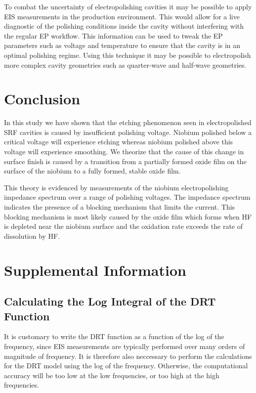 \documentclass[11pt]{article}
\begin{document}
To combat the uncertainty of electropolishing cavities it may be possible to apply EIS measurements in the production environment. This would allow for a live diagnostic of the polishing conditions inside the cavity without interfering with the regular EP workflow. This information can be used to tweak the EP parameters such as voltage and temperature to ensure that the cavity is in an optimal polishing regime. Using this technique it may be possible to electropolish more complex cavity geometries such as quarter-wave and half-wave geometries.



\section{Conclusion}
\label{sec:org57282ed}
In this study we have shown that the etching phenomenon seen in electropolished SRF cavities is caused by insufficient polishing voltage. Niobium polished below a critical voltage will experience etching whereas niobium polished above this voltage will experience smoothing. We theorize that the cause of this change in surface finish is caused by a transition from a partially formed oxide film on the surface of the niobium to a fully formed, stable oxide film.

This theory is evidenced by measurements of the niobium electropolishing impedance spectrum over a range of polishing voltages. The impedance spectrum indicates the presence of a blocking mechanism that limits the current. This blocking mechanism is most likely caused by the oxide film which forms when HF is depleted near the niobium surface and the oxidation rate exceeds the rate of dissolution by HF.


\section{Supplemental Information}
\label{sec:org60214d3}


\subsection{Calculating the Log Integral of the DRT Function}

It is customary to write the DRT function as a function of the log of the frequency, since EIS measurements are typically performed over many orders of magnitude of frequency. It is therefore also neccessary to perform the calculations for the DRT model using the log of the frequency. Otherwise, the computational accuracy will be too low at the low frequencies, or too high at the high frequencies.
\end{document}
